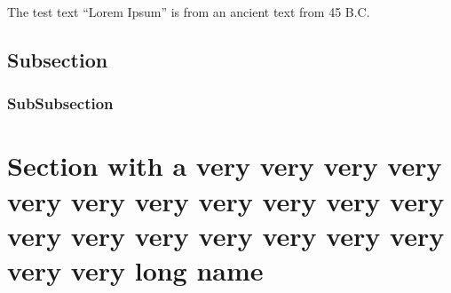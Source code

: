 The test text ``Lorem Ipsum'' is from an ancient text from 45 B.C. \cite{cicero46deFinibus, lipsomwebsite}\\
\lipsum[1-5]
\subsection{Subsection}
\lipsum[6-10]
\subsubsection{SubSubsection} 
\lipsum[11-15]
\section[Section with an extremely long name]{Section with a very very very very very very very very very very very very very very very very very very very very long name}
\lipsum[11-18]

